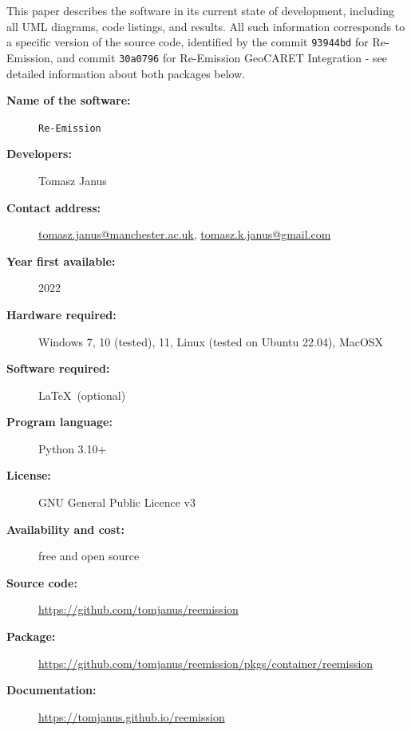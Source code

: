 \documentclass[final,1p,times]{elsarticle}
\begin{document}
This paper describes the software in its current state of development, including all UML diagrams, code listings, and results. 
All such information corresponds to a specific version of the source code, identified by the commit \texttt{93944bd} for Re-Emission, and commit \texttt{30a0796} for Re-Emission GeoCARET Integration - see detailed information about both packages below. 



\begin{description}
  \item[\textbf{Name of the software:}] \texttt{Re-Emission}
  \item[\textbf{Developers:}] Tomasz Janus
  \item[\textbf{Contact address:}] \href{mailto:tomasz.janus@manchester.ac.uk}{tomasz.janus@manchester.ac.uk}, \href{mailto:tomasz.k.janus@gmail.com}{tomasz.k.janus@gmail.com}
  \item[\textbf{Year first available:}] 2022
  \item[\textbf{Hardware required:}] Windows 7, 10 (tested), 11, Linux (tested on Ubuntu 22.04), MacOSX
  \item[\textbf{Software required:}] \LaTeX \, (optional)
  \item[\textbf{Program language:}] Python 3.10+
  \item[\textbf{License:}] GNU General Public Licence v3
  \item[\textbf{Availability and cost:}] free and open source
  \item[\textbf{Source code:}] \href{https://github.com/tomjanus/reemission}{https://github.com/tomjanus/reemission} %
  \item[\textbf{Package:}] \href{https://github.com/tomjanus/reemission/pkgs/container/reemission}{https://github.com/tomjanus/reemission/pkgs/container/reemission}
  \item[\textbf{Documentation:}] \href{https://tomjanus.github.io/reemission}{https://tomjanus.github.io/reemission}
\end{description}

\vspace{3pt}
\end{document}
